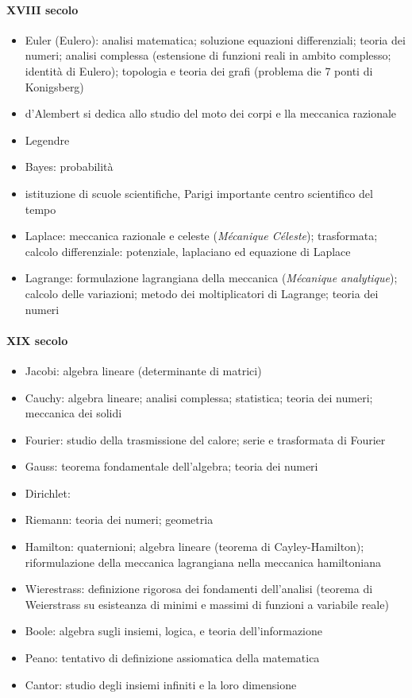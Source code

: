 \paragraph{XVIII secolo}
\begin{itemize}
  \item Euler (Eulero): analisi matematica; soluzione equazioni differenziali; teoria dei numeri; analisi complessa (estensione di funzioni reali in ambito complesso; identità di Eulero); topologia e teoria dei grafi (problema die 7 ponti di Konigsberg)
  \item d'Alembert si dedica allo studio del moto dei corpi e lla meccanica razionale
  \item Legendre
  \item Bayes: probabilità
  \item istituzione di scuole scientifiche, Parigi importante centro scientifico del tempo
  \item Laplace: meccanica razionale e celeste (\textit{Mécanique Céleste}); trasformata; calcolo differenziale: potenziale, laplaciano ed equazione di Laplace
  \item Lagrange: formulazione lagrangiana della meccanica (\textit{Mécanique analytique}); calcolo delle variazioni; metodo dei moltiplicatori di Lagrange; teoria dei numeri
\end{itemize}
\paragraph{XIX secolo}
\begin{itemize}
  \item Jacobi: algebra lineare (determinante di matrici)
  \item Cauchy: algebra lineare; analisi complessa; statistica; teoria dei numeri; meccanica dei solidi
  \item Fourier: studio della trasmissione del calore; serie e trasformata di Fourier
  \item Gauss: teorema fondamentale dell'algebra; teoria dei numeri
  \item Dirichlet:
  \item Riemann: teoria dei numeri; geometria
  \item Hamilton: quaternioni; algebra lineare (teorema di Cayley-Hamilton); riformulazione della meccanica lagrangiana nella meccanica hamiltoniana
  \item Wierestrass: definizione rigorosa dei fondamenti dell'analisi (teorema di Weierstrass su esisteanza di minimi e massimi di funzioni a variabile reale)
  \item Boole: algebra sugli insiemi, logica, e teoria dell'informazione
  \item Peano: tentativo di definizione assiomatica della matematica
  \item Cantor: studio degli insiemi infiniti e la loro dimensione
\end{itemize}
